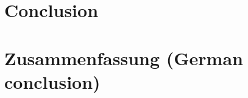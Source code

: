 \documentclass[12pt, a4paper, titlepage, oneside, abstract=true, toc=listof, toc=bibliography, BCOR=1cm]{scrreprt}
\begin{document}
{%
\chapter{Conclusion}
\label{sec:conclusion}


\chapter{Zusammenfassung (German conclusion)}

 
\cleardoublepage			

%

\cleardoublepage
\printglossary[type=software]
\label{sec:glossary}

}
\end{document}
